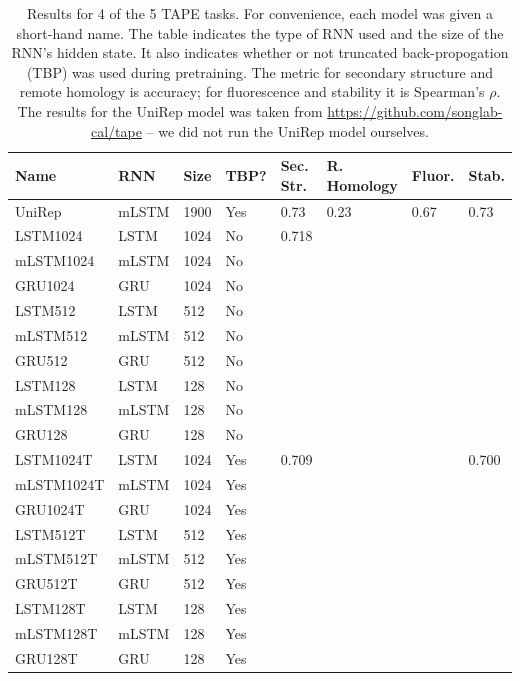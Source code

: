 \documentclass[a4paper,12pt]{article}
\begin{document}
\begin{table}[ht]
\begin{tabularx}{\linewidth}{llllllll}
\toprule
\textbf{Name} & \textbf{RNN} & \textbf{Size} & \textbf{TBP?} & \textbf{Sec. Str.} & \textbf{R. Homology} & \textbf{Fluor.} & \textbf{Stab.} \\ \hline
UniRep     & mLSTM & 1900 & Yes  & 0.73      & 0.23         & 0.67   & 0.73  \\
LSTM1024   & LSTM  & 1024 & No   & 0.718     &              &        &       \\
mLSTM1024  & mLSTM & 1024 & No   &           &              &        &       \\
GRU1024    & GRU   & 1024 & No   &           &              &        &       \\
LSTM512    & LSTM  & 512  & No   &           &              &        &       \\
mLSTM512   & mLSTM & 512  & No   &           &              &        &       \\
GRU512     & GRU   & 512  & No   &           &              &        &       \\
LSTM128    & LSTM  & 128  & No   &           &              &        &       \\
mLSTM128   & mLSTM & 128  & No   &           &              &        &       \\
GRU128     & GRU   & 128  & No   &           &              &        &       \\
LSTM1024T  & LSTM  & 1024 & Yes  & 0.709     &              &        & 0.700 \\
mLSTM1024T & mLSTM & 1024 & Yes  &           &              &        &       \\
GRU1024T   & GRU   & 1024 & Yes  &           &              &        &       \\
LSTM512T   & LSTM  & 512  & Yes  &           &              &        &       \\
mLSTM512T  & mLSTM & 512  & Yes  &           &              &        &       \\
GRU512T    & GRU   & 512  & Yes  &           &              &        &       \\
LSTM128T   & LSTM  & 128  & Yes  &           &              &        &       \\
mLSTM128T  & mLSTM & 128  & Yes  &           &              &        &       \\
GRU128T    & GRU   & 128  & Yes  &           &              &        &       \\ \bottomrule
\end{tabularx}
\caption{Results for 4 of the 5 TAPE tasks. For convenience, each model was given a short-hand name. The table indicates the type of RNN used and the size of the RNN's hidden state. It also indicates whether or not truncated back-propogation (TBP) was used during pretraining. The metric for secondary structure and remote homology is accuracy; for fluorescence and stability it is Spearman's $\rho$. The results for the UniRep model was taken from \url{https://github.com/songlab-cal/tape} -- we did not run the UniRep model ourselves.}
\label{table:taperesults}
\end{table}
\end{document}
